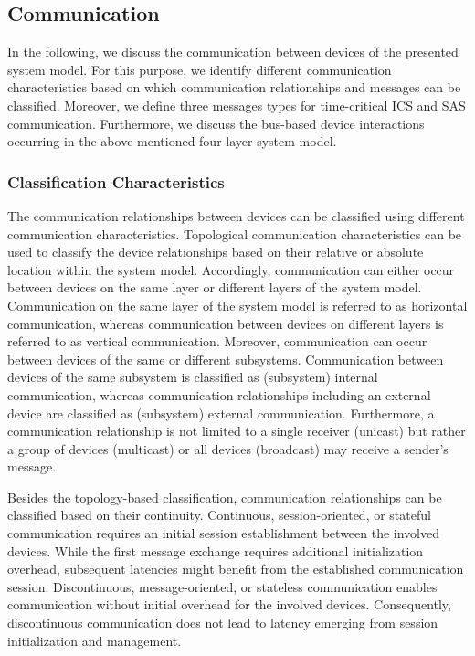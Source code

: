 \subsection{Communication}
\label{sec:approach:system_model:communication}
In the following, we discuss the communication between devices of the presented system model.
For this purpose, we identify different communication characteristics based on which communication relationships and messages can be classified.
Moreover, we define three messages types for time-critical ICS and SAS communication.
Furthermore, we discuss the bus-based device interactions occurring in the above-mentioned four layer system model.

\subsubsection{Classification Characteristics}
The communication relationships between devices can be classified using different communication characteristics.
Topological communication characteristics can be used to classify the device relationships based on their relative or absolute location within the system model.
Accordingly, communication can either occur between devices on the same layer or different layers of the system model.
Communication on the same layer of the system model is referred to as horizontal communication, whereas communication between devices on different layers is referred to as vertical communication.
Moreover, communication can occur between devices of the same or different subsystems.
Communication between devices of the same subsystem is classified as (subsystem) internal communication, whereas communication relationships including an external device are classified as (subsystem) external communication.
Furthermore, a communication relationship is not limited to a single receiver (unicast) but rather a group of devices (multicast) or all devices (broadcast) may receive a sender's message.

Besides the topology-based classification, communication relationships can be classified based on their continuity.
Continuous, session-oriented, or stateful communication requires an initial session establishment between the involved devices.
While the first message exchange requires additional initialization overhead, subsequent latencies might benefit from the established communication session.
Discontinuous, message-oriented, or stateless communication enables communication without initial overhead for the involved devices.
Consequently, discontinuous communication does not lead to latency emerging from session initialization and management.

